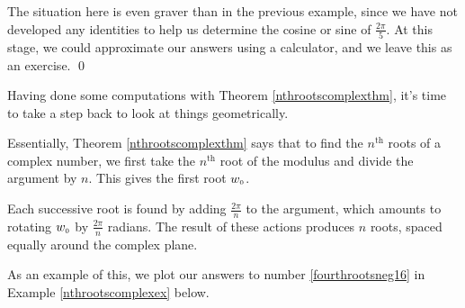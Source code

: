 \documentclass{ximera}
\begin{document}
\begin{ex}
\begin{enumerate}
\smallskip

 The situation here is even graver than in the previous example, since we have not developed any identities to help us determine the cosine or sine of $\frac{2\pi}{5}$.  At this stage, we could approximate our answers using a calculator, and we leave this as an exercise. \qed

\end{enumerate}

\end{ex}

Having done some computations with Theorem \ref{nthrootscomplexthm},  it's time to  take a step back to look at things geometrically.  

\smallskip

Essentially,  Theorem \ref{nthrootscomplexthm} says that to find the $n^{\text{th}}$ roots of a complex number,  we first take the $n^{\text{th}}$ root of the modulus and divide the argument by $n$.  This gives the first root  $w_{\text{\tiny$0$}}$. 

\smallskip

Each successive root is found by adding  $\frac{2\pi}{n}$ to the argument, which amounts to rotating $w_{\text{\tiny$0$}}$ by $\frac{2\pi}{n}$ radians. The result of these actions  produces $n$ roots, spaced equally around the complex plane.  

\smallskip

As an example of this, we plot our answers to number \ref{fourthrootsneg16} in Example \ref{nthrootscomplexex} below.
\end{document}
